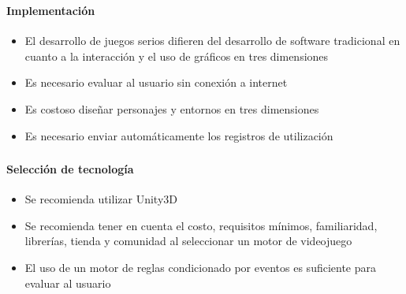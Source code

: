 \begin{frame}
\frametitle{\pagetitle}
\framesubtitle{Implementación}
\begin{itemize}[<+->]

\item El desarrollo de juegos serios difieren del desarrollo de software tradicional 
en cuanto a la interacción y el uso de gráficos en tres dimensiones


    

\item Es necesario evaluar al usuario sin conexión a internet

\item Es costoso diseñar personajes y entornos en tres dimensiones

\item Es necesario enviar automáticamente los registros de utilización 

\end{itemize}
\end{frame}

\begin{frame}[noframenumbering]
\frametitle{\pagetitle}
\framesubtitle{Selección de tecnología}
\begin{itemize}[<+->]

\item Se recomienda utilizar Unity3D 

\item Se recomienda tener en cuenta el costo, requisitos mínimos, familiaridad,
librerías, tienda y comunidad al seleccionar un motor de videojuego

\item El uso de un motor de reglas condicionado por eventos es suficiente para
evaluar al usuario

\end{itemize}
\end{frame}

